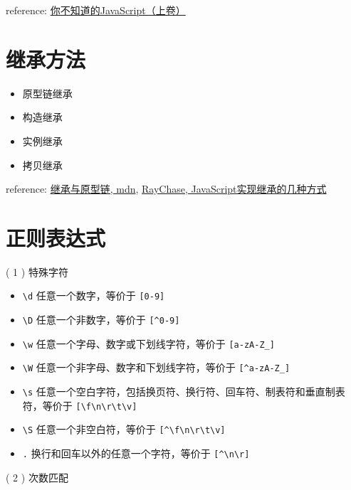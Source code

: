 reference: \href{http://book.douban.com/subject/26351021/}{你不知道的JavaScript（上卷）}

\section{继承方法}\hypertarget{section-6}{}\label{section-6}

\begin{itemize}
\item 原型链继承
\item 构造继承
\item 实例继承
\item 拷贝继承
\end{itemize}

reference: \href{https://developer.mozilla.org/zh-CN/docs/Web/JavaScript/Inheritance\_and\_the\_prototype\_chain}{继承与原型链, mdn}, \href{http://raychase.iteye.com/blog/1337415}{RayChase, JavaScript实现继承的几种方式}

\section{正则表达式}\hypertarget{section-7}{}\label{section-7}

( 1 ) 特殊字符

\begin{itemize}
\item \texttt{\textbackslash{}d} 任意一个数字，等价于 \texttt{[0-9]}
\item \texttt{\textbackslash{}D} 任意一个非数字，等价于 \texttt{[\^{}0-9]}
\item \texttt{\textbackslash{}w} 任意一个字母、数字或下划线字符，等价于 \texttt{[a-zA-Z\_]}
\item \texttt{\textbackslash{}W} 任意一个非字母、数字和下划线字符，等价于 \texttt{[\^{}a-zA-Z\_]}
\item \texttt{\textbackslash{}s} 任意一个空白字符，包括换页符、换行符、回车符、制表符和垂直制表符，等价于 \texttt{[\textbackslash{}f\textbackslash{}n\textbackslash{}r\textbackslash{}t\textbackslash{}v]}
\item \texttt{\textbackslash{}S} 任意一个非空白符，等价于 \texttt{[\^{}\textbackslash{}f\textbackslash{}n\textbackslash{}r\textbackslash{}t\textbackslash{}v]}
\item \texttt{.} 换行和回车以外的任意一个字符，等价于 \texttt{[\^{}\textbackslash{}n\textbackslash{}r]}
\end{itemize}

( 2 ) 次数匹配


